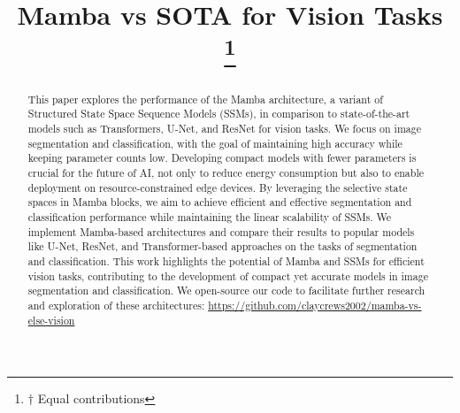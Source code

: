 \documentclass[conference]{IEEEtran}
\begin{document}
\title{Mamba vs SOTA for Vision Tasks\\
    \thanks{$\dagger$ Equal contributions}
}

\author{
    \and
}

\maketitle

\begin{abstract}
    This paper explores the performance of the Mamba architecture, a variant of Structured State Space Sequence Models (SSMs), in comparison to state-of-the-art models such as Transformers, U-Net, and ResNet for vision tasks. We focus on image segmentation and classification, with the goal of maintaining high accuracy while keeping parameter counts low. Developing compact models with fewer parameters is crucial for the future of AI, not only to reduce energy consumption but also to enable deployment on resource-constrained edge devices.
    By leveraging the selective state spaces in Mamba blocks, we aim to achieve efficient and effective segmentation and classification performance while maintaining the linear scalability of SSMs. We implement Mamba-based architectures and compare their results to popular models like U-Net, ResNet, and Transformer-based approaches on the tasks of segmentation and classification.
    This work highlights the potential of Mamba and SSMs for efficient vision tasks, contributing to the development of compact yet accurate models in image segmentation and classification. We open-source our code to facilitate further research and exploration of these architectures: \href{https://github.com/claycrews2002/mamba-vs-else-vision}{https://github.com/claycrews2002/mamba-vs-else-vision}
\end{abstract}
\end{document}

